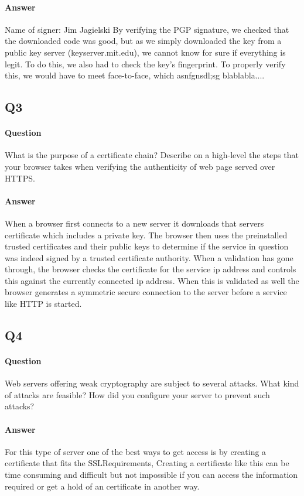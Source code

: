 \documentclass[11pt, a4paper]{article}
\begin{document}
\paragraph{Answer}
Name of signer: Jim Jagielski
By verifying the PGP signature, we checked that the downloaded code was good, but as we simply downloaded the key from a public key server (keyserver.mit.edu), we cannot know for sure if everything is legit. To do this, we also had to check the key's fingerprint. To properly verify this, we would have to meet face-to-face, which asnfgnsdl;sg blablabla....
\subsection{Q3}
\paragraph{Question}
What is the purpose of a certificate chain? Describe on a high-level the steps that your
browser takes when verifying the authenticity of web page served over HTTPS.
\paragraph{Answer}
When a browser first connects to a new server it downloads that servers certificate which includes a private key. The browser then uses the preinstalled trusted certificates and their public keys to determine if the service in question was indeed signed by a trusted certificate authority. When a validation has gone through, the browser checks the certificate for the service ip address and controls this against the currently connected ip address. When this is validated as well the browser generates a symmetric secure connection to the server before a service like HTTP is started. 
\subsection{Q4}
\paragraph{Question}
Web servers offering weak cryptography are subject to several attacks. What kind of
attacks are feasible? How did you configure your server to prevent such attacks?
\paragraph{Answer}
For this type of server one of the best ways to get access is by creating a certificate that fits the SSLRequirements, Creating a certificate like this can be time consuming and difficult but not impossible if you can access the information required or get a hold of an certificate in another way.
\end{document}
